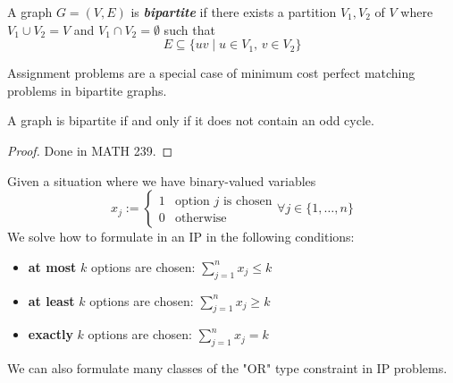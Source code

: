 \begin{defbox}
    \begin{definition}
        A graph $G=(V,E)$ is \textbf{\emph{bipartite}} if there exists a partition $V_1,V_2$
        of $V$ where $V_1\cup V_2=V$ and $V_1\cap V_2=\emptyset$ such that
        \[E\subseteq\{uv\mid u\in V_1,\, v\in V_2\}\]
    \end{definition}
\end{defbox}

Assignment problems are a special case of minimum cost perfect matching problems
in bipartite graphs.
\begin{thmbox}
    \begin{theorem}
        A graph is bipartite if and only if it does not contain an odd cycle.
    \end{theorem}
\end{thmbox}
\begin{proof}
    Done in MATH 239.
\end{proof}
Given a situation where we have binary-valued variables
\[x_j:=
    \begin{cases}
        1 & \text{option $j$ is chosen} \\
        0 & \text{otherwise}
    \end{cases}
    \forall j\in\{1,\dots,n\}
\]
We solve how to formulate in an IP in the following conditions:
\begin{itemize}
    \item \textbf{at most} $k$ options are chosen: $\displaystyle\sum\limits_{j=1}^n x_j\leqslant k$
    \item \textbf{at least} $k$ options are chosen: $\displaystyle\sum\limits_{j=1}^n x_j\geqslant  k$
    \item \textbf{exactly} $k$ options are chosen: $\displaystyle\sum\limits_{j=1}^n x_j=k$
\end{itemize}
We can also formulate many classes of the "OR" type constraint in IP problems.

